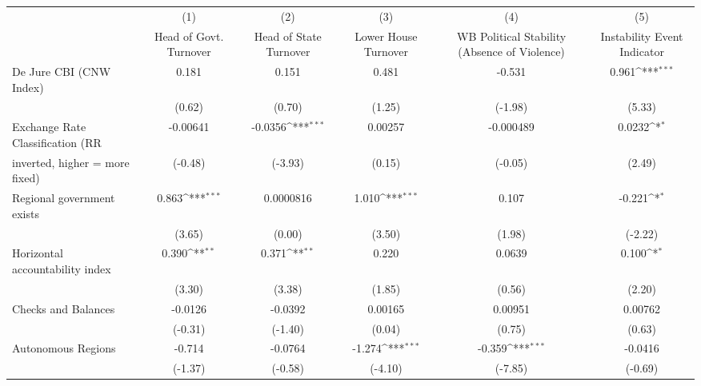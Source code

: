 {
\def\sym#1{\ifmmode^{#1}\else\(^{#1}\)\fi}
\begin{tabular}{l*{5}{c}}
\toprule
                                        &\multicolumn{1}{c}{(1)}&\multicolumn{1}{c}{(2)}&\multicolumn{1}{c}{(3)}&\multicolumn{1}{c}{(4)}&\multicolumn{1}{c}{(5)}\\
                                        &\multicolumn{1}{c}{Head of Govt. Turnover}&\multicolumn{1}{c}{Head of State Turnover}&\multicolumn{1}{c}{Lower House Turnover}&\multicolumn{1}{c}{WB Political Stability (Absence of Violence)}&\multicolumn{1}{c}{Instability Event Indicator}\\
\midrule
De Jure CBI (CNW Index)                 &0.181         &0.151         &0.481         &-0.531         &0.961\sym{***}\\
                                        &(0.62)         &(0.70)         &(1.25)         &(-1.98)         &(5.33)         \\
\addlinespace
Exchange Rate Classification (RR        &-0.00641         &-0.0356\sym{***}&0.00257         &-0.000489         &0.0232\sym{*}  \\
inverted, higher = more fixed)          &(-0.48)         &(-3.93)         &(0.15)         &(-0.05)         &(2.49)         \\
\addlinespace
Regional government exists              &0.863\sym{***}&0.0000816         &1.010\sym{***}&0.107         &-0.221\sym{*}  \\
                                        &(3.65)         &(0.00)         &(3.50)         &(1.98)         &(-2.22)         \\
\addlinespace
Horizontal accountability index         &0.390\sym{**} &0.371\sym{**} &0.220         &0.0639         &0.100\sym{*}  \\
                                        &(3.30)         &(3.38)         &(1.85)         &(0.56)         &(2.20)         \\
\addlinespace
Checks and Balances                     &-0.0126         &-0.0392         &0.00165         &0.00951         &0.00762         \\
                                        &(-0.31)         &(-1.40)         &(0.04)         &(0.75)         &(0.63)         \\
\addlinespace
Autonomous Regions                      &-0.714         &-0.0764         &-1.274\sym{***}&-0.359\sym{***}&-0.0416         \\
                                        &(-1.37)         &(-0.58)         &(-4.10)         &(-7.85)         &(-0.69)         \\

\end{tabular}}
